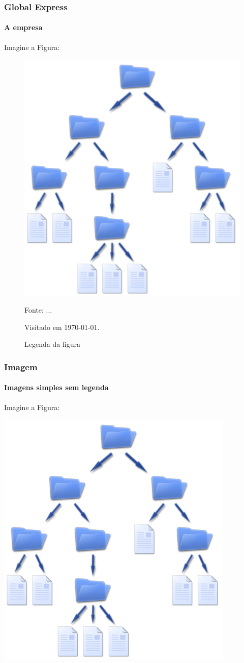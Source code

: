 \documentclass[aspectratio=169]{beamer}
\begin{document}
	\begin{frame}
		\frametitle{Global Express}
		\framesubtitle{A empresa}
		Imagine a Figura:
		
		\begin{figure}
			\centering
			\caption{Legenda da figura}
			
			\includegraphics[width=.25\linewidth]{sa.png} 
			
			\footnotesize{Fonte: ...	
				\par Visitado em \today.}
			\label{im1}
		\end{figure}	
	\end{frame}
	
	\begin{frame}
		\frametitle{Imagem}
		\framesubtitle{Imagens simples sem legenda}
			Imagine a Figura:
		
			\center
			\includegraphics[width=.25\linewidth]{sa.png} 	
	\end{frame}
	
\end{document}
